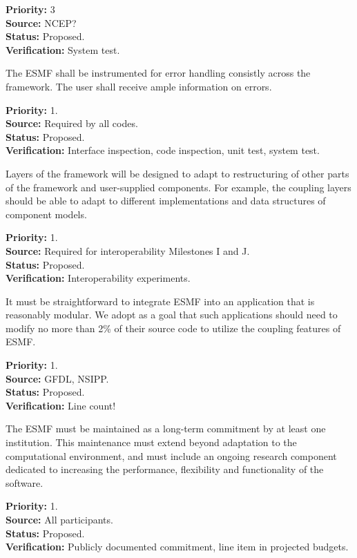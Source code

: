 \begin{reqlist}
{\bf Priority:} 3 \\
{\bf Source:} NCEP? \\
{\bf Status:} Proposed. \\
{\bf Verification:} System test.
\end{reqlist}

The ESMF shall be instrumented for error handling consistly across the
framework.  The user shall receive ample information on errors.
\begin{reqlist}
  {\bf Priority:} 1. \\
  {\bf Source:} Required by all codes. \\
  {\bf Status:} Proposed. \\
  {\bf Verification:} Interface inspection, code inspection, unit
  test, system test.
\end{reqlist}

Layers of the framework will be designed to adapt to
restructuring of other parts of the framework and user-supplied components.  
For example, the coupling layers should be able to adapt to different 
implementations and data structures of component models.
\begin{reqlist}
{\bf Priority:} 1. \\
{\bf Source:} Required for interoperability Milestones I and J. \\
{\bf Status:} Proposed. \\
{\bf Verification:} Interoperability experiments.
\end{reqlist}

It must be straightforward to integrate ESMF into an application 
that is reasonably modular.  We adopt as a goal that such applications should
need to modify no more than 2\% of their source code to utilize the coupling
features of ESMF.
\begin{reqlist}
{\bf Priority:} 1. \\
{\bf Source:} GFDL, NSIPP. \\
{\bf Status:} Proposed. \\
{\bf Verification:} Line count!
\end{reqlist}

The ESMF must be maintained as a long-term commitment by at least one
institution.  This maintenance must extend beyond adaptation to the 
computational environment, and must include an ongoing research component
dedicated to increasing the performance, flexibility and functionality of
the software.
\begin{reqlist}
{\bf Priority:} 1. \\
{\bf Source:} All participants. \\
{\bf Status:} Proposed. \\
{\bf Verification:} Publicly documented commitment, line item in 
projected budgets.
\end{reqlist}






